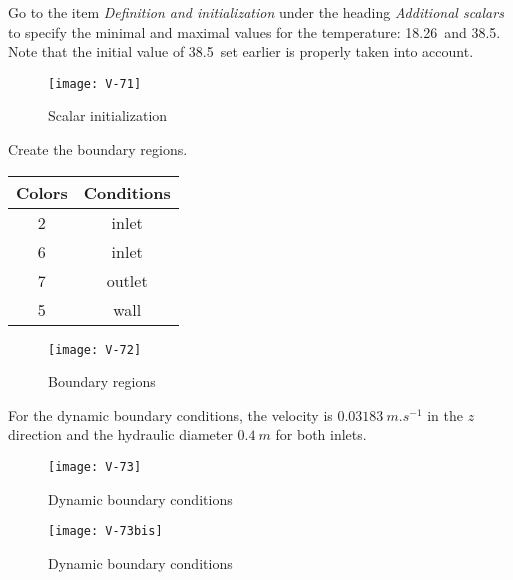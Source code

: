 \newpage

Go to the item {\itshape Definition and initialization} under the heading
{\itshape Additional scalars} to specify the minimal and maximal values for the
temperature: 18.26\degresC\ and 38.5\degresC. Note that the initial value of
38.5\degresC\ set earlier is properly taken into account.

\begin{figure}[h!]
\begin{center}
\texttt{[image: V-71]}
\caption{Scalar initialization}
\label{fig4_e5}
\end{center}
\end{figure}


\newpage
Create the boundary regions.

\begin{center}
\begin{tabular}{|c|c|}
\hline
Colors & Conditions \\
\hline
2 & inlet \\
\hline
6 & inlet \\
\hline
7 & outlet \\
\hline
5 & wall \\
\hline
\end{tabular}
\end{center}

\begin{figure}[h!]
\begin{center}
\texttt{[image: V-72]}
\caption{Boundary regions}
\label{fig5_e5}
\end{center}
\end{figure}


\newpage
For the dynamic boundary conditions, the velocity is $0.03183\ m.s^{-1}$ in the
$z$ direction and the hydraulic diameter $0.4\ m$ for both inlets.


\begin{figure}[h!]
\begin{center}
\texttt{[image: V-73]}
\caption{Dynamic boundary conditions}
\label{fig6_e5}
\end{center}
\end{figure}

\begin{figure}[h!]
\begin{center}
\texttt{[image: V-73bis]}
\caption{Dynamic boundary conditions}
\label{fig6_e5}
\end{center}
\end{figure}

